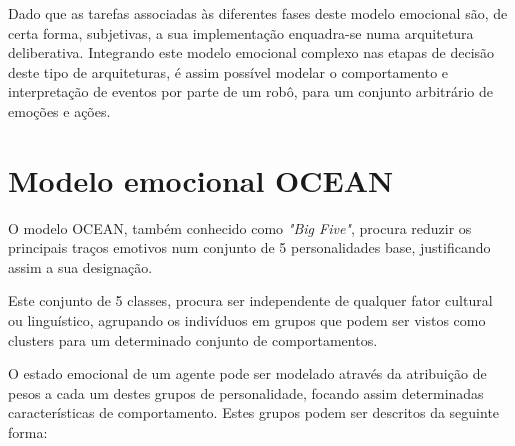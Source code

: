Dado que as tarefas associadas às diferentes fases deste modelo emocional são, de certa forma, subjetivas, a sua implementação enquadra-se numa arquitetura deliberativa. 
Integrando este modelo emocional complexo nas etapas de decisão deste tipo de arquiteturas, é assim possível modelar o comportamento e interpretação de eventos por parte de um robô, para um conjunto arbitrário de emoções e ações. 


\section{Modelo emocional OCEAN}

O modelo OCEAN, também conhecido como \textit{"Big Five"}, procura reduzir os principais traços emotivos num conjunto de 5 personalidades base, justificando assim a sua designação. 

Este conjunto de 5 classes, procura ser independente de qualquer fator cultural ou linguístico, agrupando os indivíduos em grupos que podem ser vistos como clusters para um determinado conjunto de comportamentos.

O estado emocional de um agente pode ser modelado através da atribuição de pesos a cada um destes grupos de personalidade, focando assim determinadas características de comportamento. 
Estes grupos podem ser descritos da seguinte forma:

